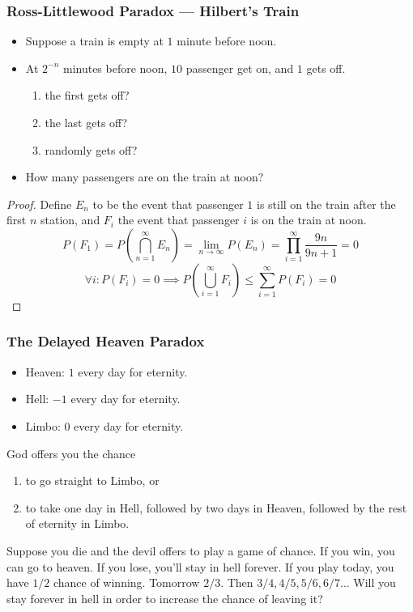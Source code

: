 \documentclass[UTF8,aspectratio=43,11pt,colorlinks,compress,openany]{beamer}%
\begin{document}
\begin{frame}\frametitle{Ross-Littlewood Paradox --- Hilbert's Train}
	\begin{block}{}
		\begin{itemize}
			\item Suppose a train is empty at $1$ minute before noon.
			\item At $2^{-n}$ minutes before noon, $10$ passenger get on, and $1$ gets off. 
			\begin{enumerate}
				\item the first gets off?
				\item the last gets off?
				\item randomly gets off?
			\end{enumerate}
			\item How many passengers are on the train at noon?
		\end{itemize}
	\end{block}\vspace{-1ex}
	\begin{proof}
		Define $E_n$ to be the event that passenger $1$ is still on the train after the first $n$ station, and $F_i$ the event that passenger $i$ is on the train at noon.
	\setlength\abovedisplayskip{0pt}
	\setlength\belowdisplayskip{0pt}
		\[P(F_1)=P\left(\bigcap\limits_{n=1}^\infty E_n\right)=\lim\limits_{n\to\infty}P(E_n)=\prod\limits_{i=1}^\infty\dfrac{9n}{9n+1}=0\]
		\[\forall i: P(F_i)=0\implies P\left(\bigcup\limits_{i=1}^\infty F_i\right)\leq\sum\limits_{i=1}^\infty P(F_i)=0\]\vspace{-1ex}
	\end{proof}
\end{frame}

\begin{frame}\frametitle{The Delayed Heaven Paradox}
	\begin{problem}
		\begin{itemize}
			\item Heaven: $1$ every day for eternity.
			\item Hell: $-1$ every day for eternity.
			\item Limbo: $0$ every day for eternity.
		\end{itemize}
		God offers you the chance
		\begin{enumerate}
			\item to go straight to Limbo, or
			\item to take one day in Hell, followed by two days in Heaven, followed by the rest of eternity in Limbo.
		\end{enumerate}
	\end{problem}
	\begin{block}{}
		Suppose you die and the devil offers to play a game of chance. If you win, you can go to heaven. If you lose, you'll stay in hell forever. If you play today, you have $1/2$ chance of winning. Tomorrow $2/3$. Then $3/4, 4/5, 5/6, 6/7\dots$ Will you stay forever in hell in order to increase the chance of leaving it? 
	\end{block}
\end{frame}
\end{document}
